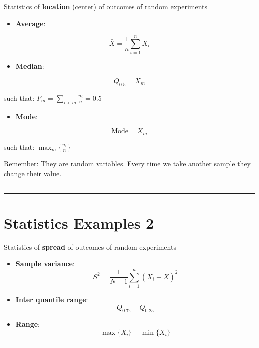 \documentclass[
]{book}
\providecommand{\tightlist}{%
  \setlength{\itemsep}{0pt}\setlength{\parskip}{0pt}}
\begin{document}
Statistics of \textbf{location} (center) of outcomes of random experiments

\begin{itemize}
\tightlist
\item
  \textbf{Average}:
\end{itemize}

\[\bar{X}=\frac{1}{n}\sum_{i=1}^n X_i\]

\begin{itemize}
\tightlist
\item
  \textbf{Median}:
\end{itemize}

\[Q_{0.5}=X_m\]

such that: \(F_m=\sum_{i<m} \frac{n_i}{n}=0.5\)

\begin{itemize}
\tightlist
\item
  \textbf{Mode}:
\end{itemize}

\[\text{Mode}= X_{m}\]

such that: \(\max_m\{\frac{n_i}{n}\}\)

Remember: They are random variables. Every time we take another sample they change their value.

\begin{center}\rule{0.5\linewidth}{0.5pt}\end{center}

\begin{center}\rule{0.5\linewidth}{0.5pt}\end{center}

\hypertarget{statistics-examples-2}{%
\section{Statistics Examples 2}\label{statistics-examples-2}}

Statistics of \textbf{spread} of outcomes of random experiments

\begin{itemize}
\item
  \textbf{Sample variance}:
  \[S^2=\frac{1}{N-1}\sum_{i=1}^n (X_i-\bar{X})^2\]
\item
  \textbf{Inter quantile range}:
  \[Q_{0.75}-Q_{0.25}\]
\item
  \textbf{Range}:
  \[\max\{X_i\}-\min\{X_i\}\]
\end{itemize}

\begin{center}\rule{0.5\linewidth}{0.5pt}\end{center}
\end{document}
